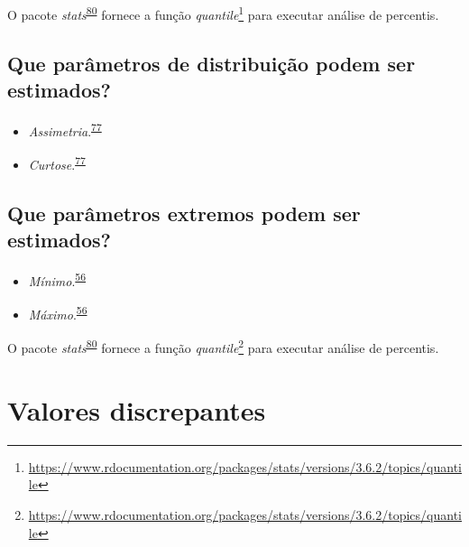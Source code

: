 \documentclass[
  a4paper,
]{book}
\renewcommand{\href}[2]{#2\footnote{\url{#1}}}
\newenvironment{infobox}[1]
  {
  \begin{itemize}
  \renewcommand{\labelitemi}{
    \raisebox{-.7\height}[0pt][0pt]{
      {\setkeys{Gin}{width=3em,keepaspectratio}
        \texttt{[image: \#1]}}
    }
  }
  \setlength{\fboxsep}{1em}
  \begin{blackbox}
  \item
  }
  {
  \end{blackbox}
  \end{itemize}
  }
\begin{document}
\begin{infobox}{images/Rlogo}
O pacote \emph{stats}\textsuperscript{\protect\hyperlink{ref-base}{80}} fornece a função \href{https://www.rdocumentation.org/packages/stats/versions/3.6.2/topics/quantile}{\emph{quantile}} para executar análise de percentis.

\end{infobox}

\hypertarget{que-paruxe2metros-de-distribuiuxe7uxe3o-podem-ser-estimados}{%
\subsection{Que parâmetros de distribuição podem ser estimados?}\label{que-paruxe2metros-de-distribuiuxe7uxe3o-podem-ser-estimados}}

\begin{itemize}
\item
  \emph{Assimetria}.\textsuperscript{\protect\hyperlink{ref-kanji2006}{77}}
\item
  \emph{Curtose}.\textsuperscript{\protect\hyperlink{ref-kanji2006}{77}}
\end{itemize}

\hypertarget{que-paruxe2metros-extremos-podem-ser-estimados}{%
\subsection{Que parâmetros extremos podem ser estimados?}\label{que-paruxe2metros-extremos-podem-ser-estimados}}

\begin{itemize}
\item
  \emph{Mínimo}.\textsuperscript{\protect\hyperlink{ref-Ali2016}{56}}
\item
  \emph{Máximo}.\textsuperscript{\protect\hyperlink{ref-Ali2016}{56}}
\end{itemize}

\begin{infobox}{images/Rlogo}
O pacote \emph{stats}\textsuperscript{\protect\hyperlink{ref-base}{80}} fornece a função \href{https://www.rdocumentation.org/packages/stats/versions/3.6.2/topics/quantile}{\emph{quantile}} para executar análise de percentis.

\end{infobox}

\hypertarget{outliers}{%
\section{Valores discrepantes}\label{outliers}}
\end{document}
